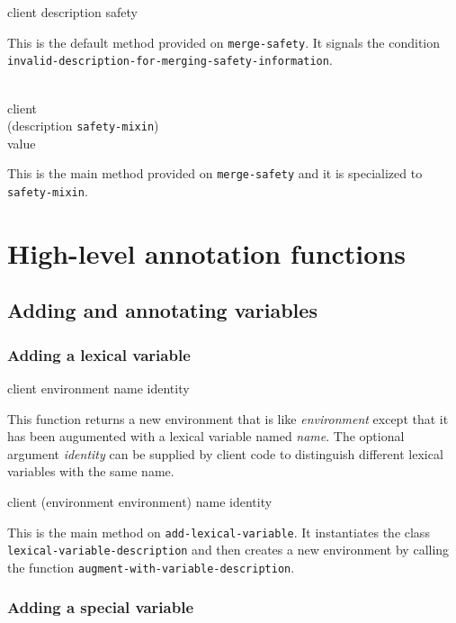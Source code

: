{\footnotesize
{} {client description safety}
}

This is the default method provided on \texttt{merge-safety}.  It
signals the condition
\texttt{invalid-description-for-merging-safety-information}.

{\footnotesize
{}\\
           {client\\
            (description {\tt safety-mixin})\\
            value}
}

This is the main method provided on \texttt{merge-safety} and it is
specialized to \texttt{safety-mixin}.

\section{High-level annotation functions}
\label{sec-high-level-annotation-functions}

\subsection{Adding and annotating variables}

\subsubsection{Adding a lexical variable}

{\footnotesize
{} {client environment name \optional identity}
}

This function returns a new environment that is like
\textit{environment} except that it has been augumented with a lexical
variable named \textit{name}.  The optional argument \textit{identity}
can be supplied by client code to distinguish different lexical
variables with the same name.

{\footnotesize
{}
{client
 (environment environment)
 name
 \optional identity}
}

This is the main method on \texttt{add-lexical-variable}.  It
instantiates the class \texttt{lexical-variable-description} and then
creates a new environment by calling the function
\texttt{augment-with-variable-description}.

\subsubsection{Adding a special variable}


